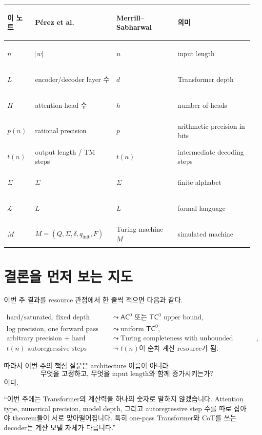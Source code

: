 \documentclass[11pt,a4paper,oneside,openany]{memoir}
\theoremstyle{definition}
\newcommand{\AC}{\mathsf{AC}}
\newcommand{\TC}{\mathsf{TC}}
\begin{document}
\begin{center}
\small
\begin{tabularx}{\textwidth}{>{\bfseries\raggedright\arraybackslash}p{}Y Y Y}
\toprule
이 노트 & Pérez et al. & Merrill--Sabharwal & 의미 \\
\midrule
$n$ & $|w|$ & $n$ & input length \\
$L$ & encoder/decoder layer 수 & $d$ & Transformer depth \\
$H$ & attention head 수 & $h$ & number of heads \\
$p(n)$ & rational precision & $p$ & arithmetic precision in bits \\
$t(n)$ & output length / TM steps & $t(n)$ & intermediate decoding steps \\
$\Sigma$ & $\Sigma$ & $\Sigma$ & finite alphabet \\
$\mathcal L$ & $L$ & $L$ & formal language \\
$M$ & $M=(Q,\Sigma,\delta,q_{\mathrm{init}},F)$ & Turing machine $M$ & simulated machine \\
\bottomrule
\end{tabularx}
\end{center}

\section{결론을 먼저 보는 지도}

이번 주 결과를 resource 관점에서 한 줄씩 적으면 다음과 같다.

\begin{align*}
\text{hard/saturated, fixed depth}
&\leadsto \AC^0\text{ 또는 }\TC^0\text{ upper bound},\\
\text{log precision, one forward pass}
&\leadsto \text{uniform }\TC^0,\\
\text{arbitrary precision + hard attention}
&\leadsto \text{Turing completeness with unbounded decoding},\\
t(n)\text{ autoregressive steps}
&\leadsto t(n)\text{이 순차 계산 resource가 됨}.
\end{align*}

따라서 이번 주의 핵심 질문은 architecture 이름이 아니라
\[
\boxed{\text{무엇을 고정하고, 무엇을 input length와 함께 증가시키는가?}}
\]
이다.

\begin{presentbox}
``이번 주에는 Transformer의 계산력을 하나의 숫자로 말하지 않겠습니다. Attention type, numerical precision, model depth, 그리고 autoregressive step 수를 따로 잡아야 theorem들이 서로 맞아떨어집니다. 특히 one-pass Transformer와 CoT를 쓰는 decoder는 계산 모델 자체가 다릅니다.''
\end{presentbox}
\end{document}
